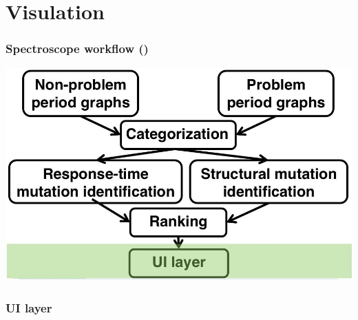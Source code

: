 \documentclass[11pt]{beamer}
\begin{document}
\section{Visulation}
\begin{frame}
\frametitle{Spectroscope workflow ()}
\includegraphics[width=\textwidth]{res/work4.jpg}
\end{frame}

\begin{frame}
\frametitle{UI layer}
\end{frame}
\end{document}
